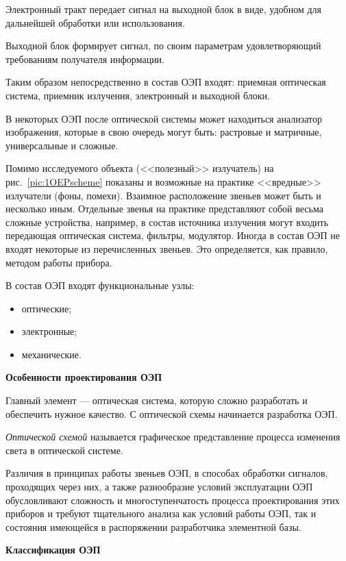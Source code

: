 Электронный тракт передает сигнал на выходной блок в виде, удобном для дальнейшей обработки или использования. 

Выходной блок формирует сигнал, по своим параметрам удовлетворяющий требованиям получателя информации.

Таким образом непосредственно в состав ОЭП входят: приемная оптическая система, приемник излучения, электронный и выходной блоки. 

В некоторых ОЭП после оптической системы может находиться анализатор изображения, которые в свою очередь могут быть: растровые и матричные, универсальные и сложные.

Помимо исследуемого объекта (<<полезный>> излучатель) на рис.~\ref{pic:1OEPscheme} показаны и возможные на практике <<вредные>> излучатели (фоны, помехи). Взаимное расположение звеньев может быть и несколько иным. Отдельные звенья на практике представляют собой весьма сложные устройства, например, в состав источника излучения могут входить передающая оптическая система, фильтры, модулятор. Иногда в состав ОЭП не входят некоторые из перечисленных звеньев. Это определяется, как правило, методом работы прибора.

В состав ОЭП входят функциональные узлы:
\begin{itemize}
	\item оптические;
	\item электронные;
	\item механические.
\end{itemize}

\begin{flushleft}
	\textbf{Особенности проектирования ОЭП}
\end{flushleft}

Главный элемент --- оптическая система, которую сложно разработать и обеспечить нужное качество. С оптической схемы начинается разработка ОЭП.

\textit{Оптической схемой} называется графическое представление процесса изменения света в оптической системе.

Различия в принципах работы звеньев ОЭП, в способах обработки сигналов, проходящих через них, а также разнообразие условий эксплуатации ОЭП обусловливают сложность и многоступенчатость процесса проектирования этих приборов и требуют тщательного анализа как условий работы ОЭП, так и состояния имеющейся в распоряжении разработчика элементной базы.

\begin{flushleft}
	\textbf{Классификация ОЭП}
\end{flushleft}

